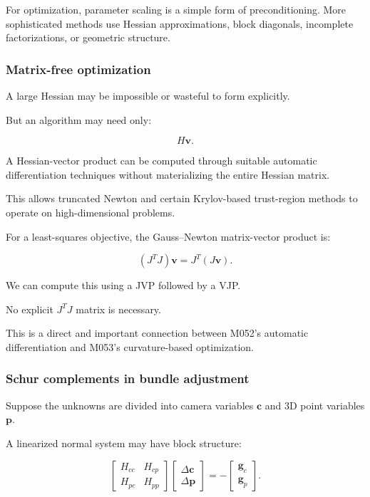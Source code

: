 For optimization, parameter scaling is a simple form of preconditioning. More sophisticated methods use Hessian approximations, block diagonals, incomplete factorizations, or geometric structure.

\subsubsection{Matrix-free optimization}\label{02-foundations-ii-ch028-matrix-free-optimization}

\hypertarget{02-foundations-ii-ch028-matrix-free-optimization}{}

A large Hessian may be impossible or wasteful to form explicitly.

But an algorithm may need only:

\[
H\mathbf v.
\]

A Hessian-vector product can be computed through suitable automatic differentiation techniques without materializing the entire Hessian matrix.

This allows truncated Newton and certain Krylov-based trust-region methods to operate on high-dimensional problems.

For a least-squares objective, the Gauss--Newton matrix-vector product is:

\[
\boxed{ (J^TJ)\mathbf v = J^T(J\mathbf v) }.
\]

We can compute this using a JVP followed by a VJP.

No explicit \(J^TJ\) matrix is necessary.

This is a direct and important connection between M052's automatic differentiation and M053's curvature-based optimization.

\subsubsection{Schur complements in bundle adjustment}\label{02-foundations-ii-ch028-schur-complements-in-bundle-adjustment}

\hypertarget{02-foundations-ii-ch028-schur-complements-in-bundle-adjustment}{}

Suppose the unknowns are divided into camera variables \(\mathbf c\) and 3D point variables \(\mathbf p\).

A linearized normal system may have block structure:

\[
\begin{bmatrix} H_{cc}&H_{cp}\\ H_{pc}&H_{pp} \end{bmatrix} \begin{bmatrix} \Delta\mathbf c\\ \Delta\mathbf p \end{bmatrix} = - \begin{bmatrix} \mathbf g_c\\ \mathbf g_p \end{bmatrix}.
\]

